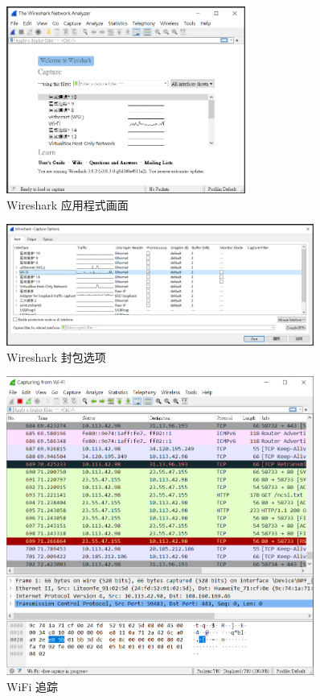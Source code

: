 \begin{figure}[htb]
\centering 
\includegraphics[width=0.70\textwidth]{img/ch1s1m8.png} 
\caption{Wireshark 应用程式画面}
\label{Test}
\end{figure}

\begin{figure}[htb]
\centering 
\includegraphics[width=0.90\textwidth]{img/ch1s1m9.png} 
\caption{Wireshark 封包选项}
\label{Test}
\end{figure}

\begin{figure}[htb]
\centering 
\includegraphics[width=0.90\textwidth]{img/ch1s1m10.png} 
\caption{WiFi 追踪}
\label{Test}
\end{figure}

